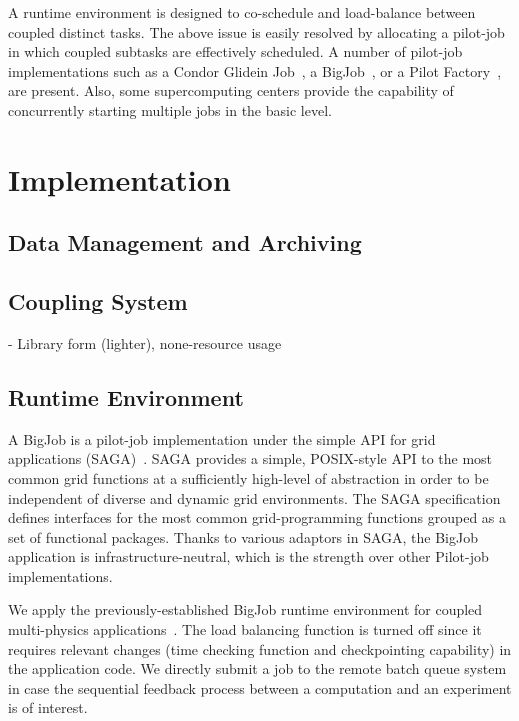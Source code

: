 \documentclass[10pt,conference]{IEEEtran}
\begin{document}
A runtime environment is designed to co-schedule and load-balance between
coupled distinct tasks. The above issue is easily resolved by allocating
a pilot-job in which coupled subtasks are effectively scheduled. A number of
pilot-job implementations such as a Condor Glidein Job~\cite{Condor},
a BigJob~\cite{repex_ptrsa}, or a Pilot Factory~\cite{PilotFactory},
are present. Also, some supercomputing centers provide the capability of
concurrently starting multiple jobs in the basic level.

\section{Implementation}
\label{sec:implementation}

\subsection{Data Management and Archiving}

\subsection{Coupling System}
- Library form (lighter), none-resource usage

\subsection{Runtime Environment}
A BigJob is a pilot-job implementation under the simple API for grid applications 
(SAGA)~\cite{saga_url}. SAGA provides a simple, POSIX-style API to the most common 
grid functions at a sufficiently high-level of abstraction in order to 
be independent of diverse and dynamic grid environments. The SAGA speciﬁcation 
defines interfaces for the most common grid-programming functions grouped as 
a set of functional packages. Thanks to various adaptors in SAGA, the BigJob
application is infrastructure-neutral, which is the strength over other
Pilot-job implementations.

We apply the previously-established BigJob runtime environment for coupled
multi-physics applications~\cite{CCGrid_Hybrid}. The load balancing function
is turned off since it requires relevant changes (time checking function and
checkpointing capability) in the application code.
We directly submit a job to the remote batch queue system in case the
sequential feedback process between a computation and an experiment is
of interest.
\end{document}
